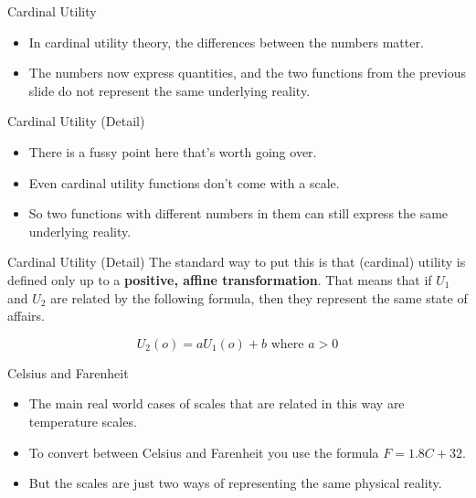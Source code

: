 \documentclass[
  14pt,
  letterpaper,
  ignorenonframetext,
  aspectratio=169,
]{beamer}
\providecommand{\tightlist}{%
  \setlength{\itemsep}{0pt}\setlength{\parskip}{0pt}}\usepackage{longtable,booktabs,array}
\let\olditem\item
\renewcommand{\item}{%
\olditem\vspace{6pt}}
\begin{document}
\begin{frame}{Cardinal Utility}
\protect\hypertarget{cardinal-utility}{}
\begin{itemize}[<+->]
\tightlist
\item
  In cardinal utility theory, the differences between the numbers
  matter.
\item
  The numbers now express quantities, and the two functions from the
  previous slide do not represent the same underlying reality.
\end{itemize}
\end{frame}

\begin{frame}{Cardinal Utility (Detail)}
\protect\hypertarget{cardinal-utility-detail}{}
\begin{itemize}[<+->]
\tightlist
\item
  There is a fussy point here that's worth going over.
\item
  Even cardinal utility functions don't come with a scale.
\item
  So two functions with different numbers in them can still express the
  same underlying reality.
\end{itemize}
\end{frame}

\begin{frame}{Cardinal Utility (Detail)}
\protect\hypertarget{cardinal-utility-detail-1}{}
The standard way to put this is that (cardinal) utility is defined only
up to a \textbf{positive, affine transformation}. That means that if
\(U_1\) and \(U_2\) are related by the following formula, then they
represent the same state of affairs.

\[
U_2(o) = aU_1(o) + b \text{ where } a > 0
\]
\end{frame}

\begin{frame}{Celsius and Farenheit}
\protect\hypertarget{celsius-and-farenheit}{}
\begin{itemize}[<+->]
\tightlist
\item
  The main real world cases of scales that are related in this way are
  temperature scales.
\item
  To convert between Celsius and Farenheit you use the formula
  \(F = 1.8C + 32\).
\item
  But the scales are just two ways of representing the same physical
  reality.
\end{itemize}
\end{frame}
\end{document}
